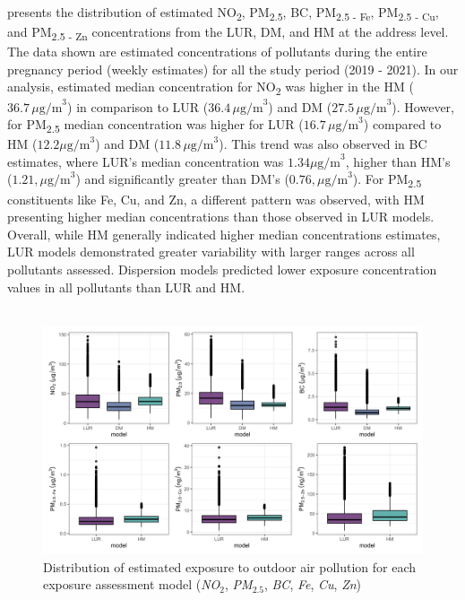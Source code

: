 \documentclass{article}
\begin{document}
\textbf{} presents the distribution of estimated NO\textsubscript{2}, PM\textsubscript{2.5}, BC,  PM\textsubscript{2.5 - Fe}, PM\textsubscript{2.5 - Cu}, and PM\textsubscript{2.5 - Zn} concentrations from the LUR, DM, and HM at the address level. The data shown are estimated concentrations of pollutants during the entire pregnancy period (weekly estimates) for all the study period (2019 - 2021). In our analysis, estimated median concentration for NO\textsubscript{2} was higher in the HM ($36.7 \, \mu\text{g/m}^{3}$) in comparison to LUR ($36.4 \, \mu\text{g/m}^{3}$) and DM ($27.5 \, \mu\text{g/m}^{3}$). However, for PM\textsubscript{2.5} median concentration was higher for LUR ($16.7 \, \mu\text{g/m}^{3}$) compared to HM ($12.2 \mu\text{g/m}^{3}$) and DM ($11.8 \, \mu\text{g/m}^{3}$). This trend was also observed in BC estimates, where LUR's median concentration was $1.34  \mu\text{g/m}^{3}$, higher than HM's ($1.21 , \mu\text{g/m}^{3}$) and significantly greater than DM's ($0.76 , \mu\text{g/m}^{3}$). For PM\textsubscript{2.5} constituents like Fe, Cu, and Zn, a different pattern was observed, with HM presenting higher median concentrations than those observed in LUR models. Overall, while HM generally indicated higher median concentrations estimates, LUR models demonstrated greater variability with larger ranges across all pollutants assessed. Dispersion models predicted lower exposure concentration values in all pollutants than LUR and HM. \\\\

\vspace{-2em}
\begin{figure}[!h]
\includegraphics[width=1\textwidth]{figures/boxplot_all_models_estimates.png}
\caption{Distribution of estimated exposure to outdoor air pollution for each exposure assessment model (\textit{NO$_2$}, \textit{PM$_{2.5}$}, \textit{BC}, \textit{Fe}, \textit{Cu}, \textit{Zn})}
\label{fig4}
\end{figure}
\end{document}
